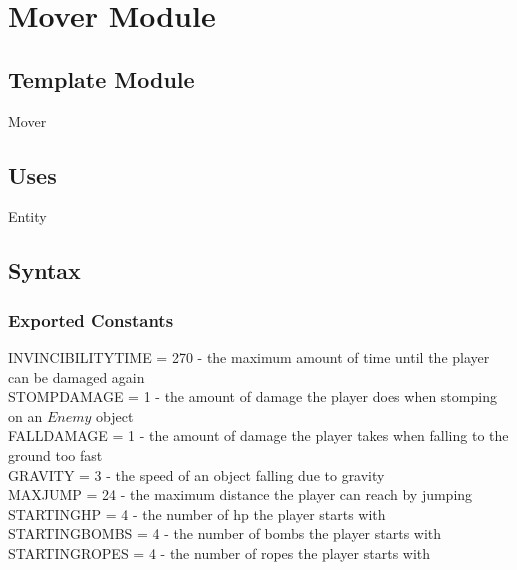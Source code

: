 \documentclass[12pt]{article}
\begin{document}
\newpage

\section*{Mover Module}

\subsection*{Template Module}

Mover

\subsection*{Uses}

Entity
\subsection*{Syntax}

\subsubsection*{Exported Constants}
INVINCIBILITYTIME = 270 - the maximum amount of time until the player can be damaged again\\
STOMPDAMAGE = 1 - the amount of damage the player does when stomping on an $Enemy$ object\\
FALLDAMAGE = 1 - the amount of damage the player takes when falling to the ground too fast\\
GRAVITY = 3 - the speed of an object falling due to gravity\\
MAXJUMP = 24 - the maximum distance the player can reach by jumping\\
STARTINGHP = 4 - the number of hp the player starts with\\
STARTINGBOMBS = 4 - the number of bombs the player starts with\\
STARTINGROPES = 4 - the number of ropes the player starts with


\end{document}
